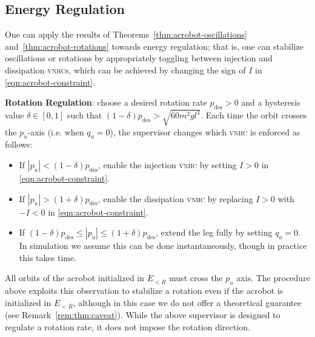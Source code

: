 \documentclass[journal,twoside,web, twocolumn,draftcls]{ieeecolor}
\newcommand*{\vnhc}{\textsc{vnhc}\xspace}
\newcommand*{\vnhcs}{\textsc{vnhc}s\xspace}
\begin{document}
\subsection{Energy Regulation}\label{sec:energy-reg}
One can apply the results of Theorems~\ref{thm:acrobot-oscillations} and~\ref{thm:acrobot-rotations}
towards energy regulation; 
that is, one can stabilize oscillations or rotations by appropriately toggling
between injection and dissipation \vnhcs, which can be achieved by changing the
sign of \(I\) in \eqref{eqn:acrobot-constraint}.



\textbf{Rotation Regulation}: choose a desired rotation rate 
\(p_\text{des} > 0\) and a hysteresis value \(\delta \in [0,1]\) such that \((1-\delta) p_\text{des} > \sqrt{60m^2gl^3}\). Each time the orbit crosses the \(p_u\)-axis (i.e. when \(q_u = 0\)), the
supervisor changes which \vnhc is enforced as follows:
\begin{itemize}
    \item If \(|p_u| < (1-\delta)p_\text{des}\), enable the injection \vnhc by
        setting \(I > 0\) in \eqref{eqn:acrobot-constraint}.
    \item If \(|p_u| > (1+\delta)p_\text{des}\), enable the dissipation \vnhc by
        replacing \(I > 0\) with \(-I < 0\) in \eqref{eqn:acrobot-constraint}.
    \item If \((1-\delta)p_\text{des} \leq |p_u| \leq (1+\delta)p_\text{des}\),
        extend the leg fully by setting \(q_a = 0\).
        In simulation we assume this can be done instantaneously,
        though in practice this takes time.
\end{itemize}

All orbits of the acrobot initialized in $E_{< \bar R}$ must cross the \(p_u\) axis. The procedure above exploits this observation to stabilize a rotation even if the acrobot is initialized in $E_{< \bar R}$, although in this case we do not offer a theoretical guarantee (see Remark~\ref{rem:thm:caveat}). While the above supervisor is designed to regulate a rotation rate, it
does not impose the rotation direction.

\end{document}
